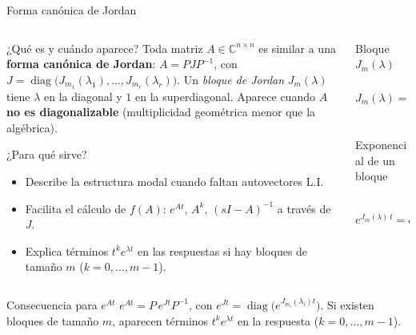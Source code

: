 \documentclass[
    10pt,
    aspectratio=169,
    xcolor={dvipsnames},
    spanish,
    ]{beamer}
\begin{document}
\begin{frame}{Forma canónica de Jordan}
\footnotesize
\begin{columns}[T]
  \begin{column}{0.45\textwidth}
    \begin{block}{¿Qué es y cuándo aparece?}
      Toda matriz $A\in\mathbb{C}^{n\times n}$ es similar a una \textbf{forma canónica de Jordan}: $A=PJP^{-1}$, con
      $J=\operatorname{diag}\big(J_{m_1}(\lambda_1),\dots,J_{m_r}(\lambda_r)\big)$. Un \emph{bloque de Jordan} $J_m(\lambda)$
      tiene $\lambda$ en la diagonal y $1$ en la superdiagonal.
      Aparece cuando $A$ \textbf{no es diagonalizable} (multiplicidad geométrica menor que la algébrica).
    \end{block}
    \begin{block}{¿Para qué sirve?}
      \begin{itemize}\itemsep2pt
        \item Describe la estructura modal cuando faltan autovectores L.I.
        \item Facilita el cálculo de $f(A)$: $e^{At}$, $A^k$, $(sI{-}A)^{-1}$ a través de $J$.
        \item Explica términos $t^k e^{\lambda t}$ en las respuestas si hay bloques de tamaño $m$ ($k=0,\dots,m{-}1$).
      \end{itemize}
    \end{block}
  \end{column}
  \begin{column}{0.5\textwidth}
    \begin{block}{Bloque $J_m(\lambda)$}
      \[
      J_m(\lambda)=\begin{pmatrix}
        \lambda & 1 &  & 0\\
         & \lambda & \ddots & \\
         &  & \ddots & 1\\
        0 &  &  & \lambda
      \end{pmatrix}
      \]
    \end{block}
    \begin{block}{Exponencial de un bloque}
      \[
      e^{J_m(\lambda)\,t}=e^{\lambda t}
      \begin{pmatrix}
        1 & t & t^2/2! & \cdots & t^{m-1}/(m-1)!\\
        0 & 1 & t & \cdots & t^{m-2}/(m-2)!\\
        \vdots &  & \ddots & \ddots & \vdots\\
        0 & \cdots & 0 & 1 & t\\
        0 & \cdots & 0 & 0 & 1
      \end{pmatrix}
      \]
    \end{block}
  \end{column}
\end{columns}
\begin{block}{Consecuencia para $e^{At}$}
  $e^{At}=P\,e^{Jt}P^{-1}$, con $e^{Jt}=\operatorname{diag}\big(e^{J_{m_i}(\lambda_i)t}\big)$. Si existen bloques de tamaño $m$, aparecen términos $t^k e^{\lambda t}$ en la respuesta ($k=0,\dots,m{-}1$).
\end{block}
\end{frame}
\end{document}
